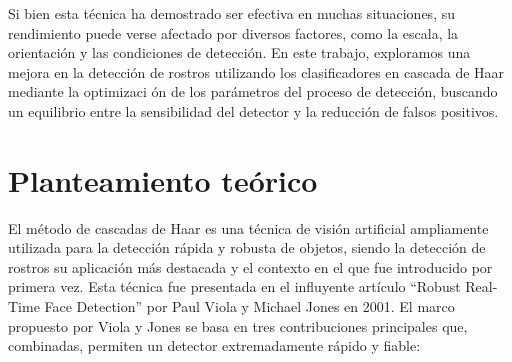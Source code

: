\documentclass[a4paper]{article}
\begin{document}
Si bien esta
técnica ha demostrado ser efectiva en muchas situaciones, su rendimiento puede
verse afectado por diversos factores, como la escala, la orientación y las condiciones
de detección. En este trabajo, exploramos una mejora en la detección
de rostros utilizando los clasificadores en cascada de Haar mediante la optimizaci
ón de los parámetros del proceso de detección, buscando un equilibrio entre
la sensibilidad del detector y la reducción de falsos positivos.

\section{Planteamiento teórico}

El método de cascadas de Haar es una técnica de visión artificial ampliamente utilizada para la detección rápida y robusta de objetos, siendo la detección de rostros su aplicación más destacada y el contexto en el que fue introducido por primera vez. Esta técnica fue presentada en el influyente artículo ``Robust Real-Time Face Detection'' por Paul Viola y Michael Jones en 2001. El marco propuesto por Viola y Jones se basa en tres contribuciones principales que, combinadas, permiten un detector extremadamente rápido y fiable:
\end{document}
